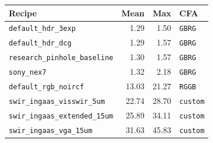 \begin{tabular}{@{}lrrl@{}}
\toprule
Recipe & Mean & Max & CFA \\
\midrule
\texttt{default\_hdr\_3exp} & 1.29 & 1.50 & \texttt{GBRG} \\
\texttt{default\_hdr\_dcg} & 1.29 & 1.57 & \texttt{GBRG} \\
\texttt{research\_pinhole\_baseline} & 1.30 & 1.57 & \texttt{GBRG} \\
\texttt{sony\_nex7} & 1.32 & 2.18 & \texttt{GBRG} \\
\texttt{default\_rgb\_noircf} & 13.03 & 21.27 & \texttt{RGGB} \\
\texttt{swir\_ingaas\_visswir\_5um} & 22.74 & 28.70 & \texttt{custom} \\
\texttt{swir\_ingaas\_extended\_15um} & 25.89 & 34.11 & \texttt{custom} \\
\texttt{swir\_ingaas\_vga\_15um} & 31.63 & 45.83 & \texttt{custom} \\
\bottomrule
\end{tabular}
